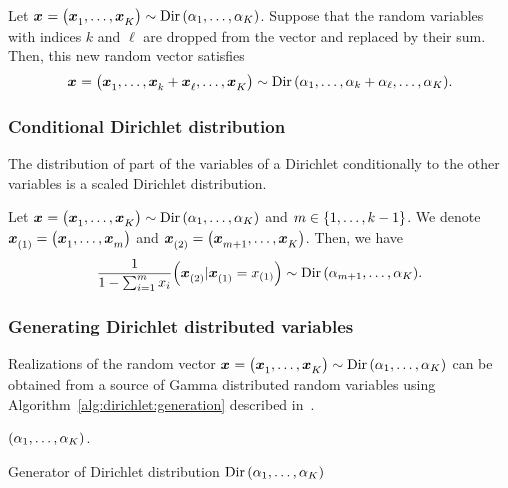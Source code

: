 \begin{prop}\label{prop:dirichlet:aggregation}
  Let $\va x=\bracket{\va x_1,\ldots,\va x_K}\sim \Dir\bracket{\alpha_1,\ldots,\alpha_K}$.
  Suppose that the random variables with indices $k$ and $\ell$ are dropped from the vector and replaced by their sum.
  Then, this new random vector satisfies
  \begin{equation}
    \va x=\bracket{\va x_1,\ldots,\va x_k+\va x_{\ell},\ldots,\va x_K}\sim \Dir\bracket{\alpha_1,\ldots,\alpha_k+\alpha_{\ell},\ldots,\alpha_K}.
  \end{equation}
\end{prop}


\subsubsection{Conditional Dirichlet distribution}


The distribution of part of the variables of a Dirichlet conditionally to the other variables is a scaled Dirichlet distribution.


\begin{prop}\label{prop:dirichlet:conditional}
  Let $\va x=\bracket{\va x_1,\ldots,\va x_K}\sim \Dir\bracket{\alpha_1,\ldots,\alpha_K}$ and $m\in\range[1]{k-1}$.
  We denote $\va x_{(1)}=\bracket{\va x_1,\ldots,\va x_m}$ and $\va x_{(2)}=\bracket{\va x_{m+1},\ldots,\va x_K}$.
  Then, we have
  \begin{equation}
    \frac{1}{1-\sum_{i=1}^m x_i} \bracket{\va x_{(2)}|\va x_{(1)}=x_{(1)}}
    \sim
    \Dir\bracket{\alpha_{m+1},\ldots,\alpha_K}.
  \end{equation}
\end{prop}


\subsubsection{Generating Dirichlet distributed variables}


Realizations of the random vector $\va x=\bracket{\va x_1,\ldots,\va x_K}\sim\Dir\bracket{\alpha_1,\ldots,\alpha_K}$ can be obtained from a source of Gamma distributed random variables using Algorithm~\ref{alg:dirichlet:generation} described in~\citet{Frigyik2010}.


\begin{algorithm}


\BlankLine






\BlankLine


\Return $\bracket{\alpha_1,\ldots,\alpha_K}$.\;


\BlankLine
\caption{Generator of Dirichlet distribution $\Dir\bracket{\alpha_1,\ldots,\alpha_K}$}
\label{alg:dirichlet:generation}
\end{algorithm}


